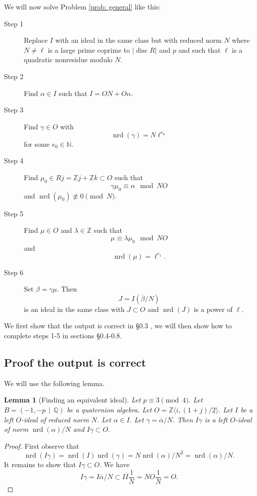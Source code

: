 \documentclass[10pt]{article}
\theoremstyle{plain}
\newtheorem{lemma}[theorem]{Lemma}
\theoremstyle{definition}
\newcommand{\op}{\operatorname}
\newcommand{\N}{\mathbb{N}}
\newcommand{\Z}{\mathbb{Z}}
\newcommand{\Q}{\mathbb{Q}}
\newcommand{\nrd}{\op{nrd}}
\newcommand{\disc}{\op{disc}}
\begin{document}
We will now solve Problem \ref{prob: general} like this:

\begin{description}
    \item[Step 1]
    Replace \( I \) with an ideal in the same class but with reduced norm \( N \) where \( N \neq \ell \) is a large prime coprime to \( |\disc R| \) and \( p \) and such that \( \ell \) is a quadratic nonresidue modulo \( N \).

    \item[Step 2]
    Find \( \alpha \in I \) such that \( I = ON + O\alpha \).

    \item[Step 3]
    Find \( \gamma \in O \) with
    \[
        \nrd(\gamma) = N \ell^{e_0}
    \]
    for some \( e_0 \in \N \).

    \item[Step 4]
    Find \( \mu_0 \in Rj = \Z j + \Z k \subset  O \) such that
    \[
        \gamma\mu_0 \equiv \alpha \mod NO
    \]
    and \( \nrd(\mu_0) \not\equiv 0 \pmod{N} \).

    \item[Step 5]
    Find \( \mu \in  O \) and \( \lambda \in \Z \) such that
    \[
        \mu \equiv \lambda \mu_0 \mod NO
    \]
    and
    \[
        \nrd(\mu) = \ell^{e_1}.
    \]

    \item[Step 6]
    Set \( \beta = \gamma \mu \).
    Then
    \[
        J = I(\overline{\beta}/N)
    \]
    is an ideal in the same class with \( J \subset O \) and \( \nrd(J) \) is a power of \( \ell \).
\end{description}


We first show that the output is correct in \S 0.3 , we will then show how to complete steps 1-5 in sections \S 0.4-0.8.

\subsection{Proof the output is correct}
We will use the following lemma.
\begin{lemma}[Finding an equivalent ideal] \label{lem: change norm}
    Let \( p \equiv 3 \pmod{4} \).
    Let \( B =  (-1, -p \, \mid \, \Q) \) be a quaternion algebra.
    Let \( O = \Z \langle i, (1+j) / 2 \rangle \).
    Let \( I \) be a left \( O \)-ideal of reduced norm \( N \).
    Let \( \alpha \in I \).
    Let \( \gamma = \overline{\alpha} / N \).
    Then \( I \gamma \) is a left \( O \)-ideal of norm \( \nrd(\alpha) / N \) and \( I \gamma \subset O \).
\end{lemma}
\begin{proof}
    First observe that
    \[
        \nrd(I \gamma) = \nrd(I)\nrd(\gamma) = N \nrd(\alpha) / N^2 = \nrd(\alpha) / N.
    \]
    It remains to show that \( I\gamma \subset O \).
    We have
    \[
        I\gamma = I\overline{\alpha} / N \subset I\overline{I} \frac{1}{N} = NO \frac{1}{N} = O.
    \]
\end{proof}
\end{document}
